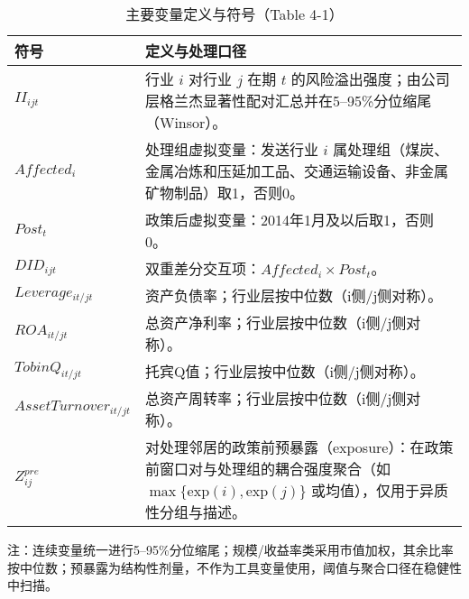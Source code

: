 \begin{table}[htbp]
\centering
\caption{主要变量定义与符号（Table 4-1）}
\label{tab:variables_4_1}
\begin{threeparttable}
\small
\begin{tabular}{lp{10.5cm}}
\toprule
\textbf{符号} & \textbf{定义与处理口径} \\
\midrule
$II_{ijt}$ & 行业 $i$ 对行业 $j$ 在期 $t$ 的风险溢出强度；由公司层格兰杰显著性配对汇总并在5--95\%分位缩尾（Winsor）。\\
$Affected_i$ & 处理组虚拟变量：发送行业 $i$ 属处理组（煤炭、金属冶炼和压延加工品、交通运输设备、非金属矿物制品）取1，否则0。\\
$Post_t$ & 政策后虚拟变量：2014年1月及以后取1，否则0。\\
$DID_{ijt}$ & 双重差分交互项：$Affected_i\times Post_t$。\\
$Leverage_{it/jt}$ & 资产负债率；行业层按中位数（i侧/j侧对称）。\\
$ROA_{it/jt}$ & 总资产净利率；行业层按中位数（i侧/j侧对称）。\\
$TobinQ_{it/jt}$ & 托宾Q值；行业层按中位数（i侧/j侧对称）。\\
$AssetTurnover_{it/jt}$ & 总资产周转率；行业层按中位数（i侧/j侧对称）。\\
$Z^{pre}_{ij}$ & 对处理邻居的政策前预暴露（exposure）：在政策前窗口对与处理组的耦合强度聚合（如 $\max\{\text{exp}(i),\text{exp}(j)\}$ 或均值），仅用于异质性分组与描述。\\
\bottomrule
\end{tabular}
\begin{tablenotes}
\footnotesize
\item 注：连续变量统一进行5--95\%分位缩尾；规模/收益率类采用市值加权，其余比率按中位数；预暴露为结构性剂量，不作为工具变量使用，阈值与聚合口径在稳健性中扫描。
\end{tablenotes}
\end{threeparttable}
\end{table}


